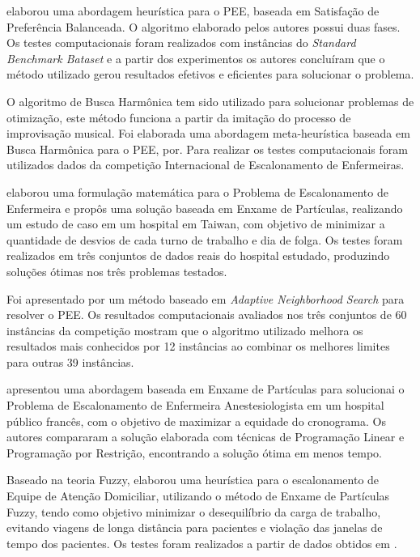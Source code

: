 \cite{constantino:2011} elaborou uma abordagem heurística para o \ac{PEE}, baseada em Satisfação de Preferência Balanceada. O algoritmo elaborado pelos autores possui duas fases. Os testes computacionais foram realizados com instâncias do \textit{Standard Benchmark Bataset} e a partir dos experimentos os autores concluíram que o método utilizado gerou resultados efetivos e eficientes para solucionar o problema.

O algoritmo de Busca Harmônica  tem sido utilizado para solucionar problemas de otimização, este método funciona a partir da imitação do processo de improvisação musical.  Foi elaborada uma abordagem meta-heurística baseada em Busca Harmônica para o \ac{PEE}, por\cite{awadallah:2011}. Para realizar os testes computacionais foram utilizados dados da competição Internacional de Escalonamento de Enfermeiras.

\cite{wu:2015} elaborou uma formulação matemática para o Problema de Escalonamento de Enfermeira e propôs uma solução baseada em Enxame de Partículas, realizando um estudo de caso em um hospital em Taiwan, com objetivo de minimizar a quantidade de desvios de cada turno de trabalho e dia de folga. Os testes foram realizados em três conjuntos de dados reais do hospital estudado, produzindo soluções ótimas nos três problemas testados.

Foi apresentado por \cite{lu:2012} um método baseado em \textit{Adaptive Neighborhood Search} para resolver o \ac{PEE}.  Os resultados computacionais avaliados nos três conjuntos de 60 instâncias da competição mostram que o algoritmo utilizado melhora os resultados mais conhecidos por 12 instâncias ao combinar os melhores limites para outras 39 instâncias.

\cite{altamirano:2010} apresentou uma abordagem baseada em Enxame de Partículas para solucionai o Problema de Escalonamento de Enfermeira Anestesiologista em um hospital público francês, com o objetivo de maximizar a equidade do cronograma. Os autores compararam a solução elaborada com técnicas de Programação Linear e Programação por Restrição, encontrando a solução ótima em menos tempo.

Baseado na teoria Fuzzy, \cite{mutingi:2013}  elaborou uma heurística para o escalonamento de Equipe de Atenção Domiciliar, utilizando o método de Enxame de Partículas Fuzzy, tendo como objetivo minimizar o desequilíbrio da carga de trabalho, evitando viagens de longa distância para pacientes e violação das janelas de tempo dos pacientes. Os testes foram realizados a partir de dados obtidos em \cite{bachouch:2010}. 

